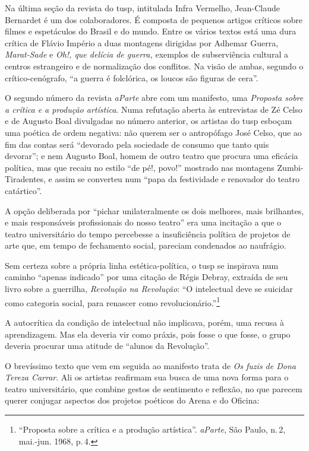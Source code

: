 Na última seção da revista do {\sc tusp}, intitulada Infra Vermelho,
Jean-Claude Bernardet é um dos colaboradores. É composta de pequenos
artigos críticos sobre filmes e espetáculos do Brasil e do mundo. Entre
os vários textos está uma dura crítica de Flávio Império a duas
montagens dirigidas por Adhemar Guerra, {\it Marat-Sade} e {\it Oh!, que
delícia de guerra,} exemplos de subserviência cultural a centros
estrangeiro e de normalização dos conflitos. Na visão de ambas, segundo
o crítico-cenógrafo, “a guerra é folclórica, os loucos são figuras de
cera”.


O segundo número da revista {\it aParte} abre com um manifesto, uma
{\it Proposta sobre a crítica e a produção artística}. Numa refutação
aberta às entrevistas de Zé Celso e de Augusto Boal divulgadas no número
anterior, os artistas do {\sc tusp} esboçam uma poética de ordem negativa: não
querem ser o antropófago José Celso, que ao fim das contas será
“devorado pela sociedade de consumo que tanto quis devorar”; e nem
Augusto Boal, homem de outro teatro que procura uma eficácia política,
mas que recaiu no estilo “de pé!, povo!” mostrado nas montagens
Zumbi-Tiradentes, e assim se converteu num “papa da festividade e
renovador do teatro catártico”.

A opção deliberada por “pichar unilateralmente os dois melhores, mais
brilhantes, e mais responsáveis profissionais do nosso teatro” era uma
incitação a que o teatro universitário do tempo percebesse a
insuficiência política de projetos de arte que, em tempo de fechamento
social, pareciam condenados ao naufrágio.

Sem certeza sobre a própria linha estética-política, o {\sc tusp} se inspirava
num caminho “apenas indicado” por uma citação de Régis Debray, extraída
de seu livro sobre a guerrilha, {\it Revolução na Revolução}: “O
intelectual deve se suicidar como categoria social, para renascer como
revolucionário.”\footnote{“Proposta sobre a crítica e a produção
  artística”. {\it aParte}, São Paulo, n.\,2, mai.-jun. 1968, p.\,4.}

A autocrítica da condição de intelectual não implicava, porém, uma
recusa à aprendizagem. Mas ela deveria vir como práxis, pois fosse o que
fosse, o grupo deveria procurar uma atitude de “alunos da Revolução”.

O brevíssimo texto que vem em seguida ao manifesto trata de {\it Os
fuzis de Dona Tereza Carrar}. Ali os artistas reafirmam sua busca de uma
nova forma para o teatro universitário, que combine gestos de sentimento
e reflexão, no que parecem querer conjugar aspectos dos projetos
poéticos do Arena e do Oficina:

